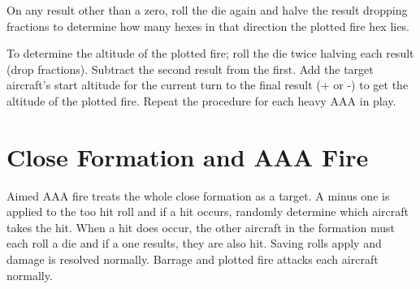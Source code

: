 \begin{advancedrules}
On any result other than a zero, roll the die again and halve the result dropping fractions to determine how many hexes in that direction the plotted fire hex lies.

To determine the altitude of the plotted fire; roll the die twice halving each result (drop fractions). Subtract the second result from the first. Add the target aircraft's start altitude for the current turn to the final result (+ or -) to get the altitude of the plotted fire. Repeat the procedure for each heavy AAA in play.

\section{Close Formation and AAA Fire}

Aimed AAA fire treats the whole close formation as a target. A minus one is applied to the too hit roll and if a hit occurs, randomly determine which aircraft takes the hit. When a hit does occur, the other aircraft in the formation must each roll a die and if a one results, they are also hit. Saving rolls apply and damage is resolved normally. Barrage and plotted fire attacks each aircraft normally.

\end{advancedrules}

